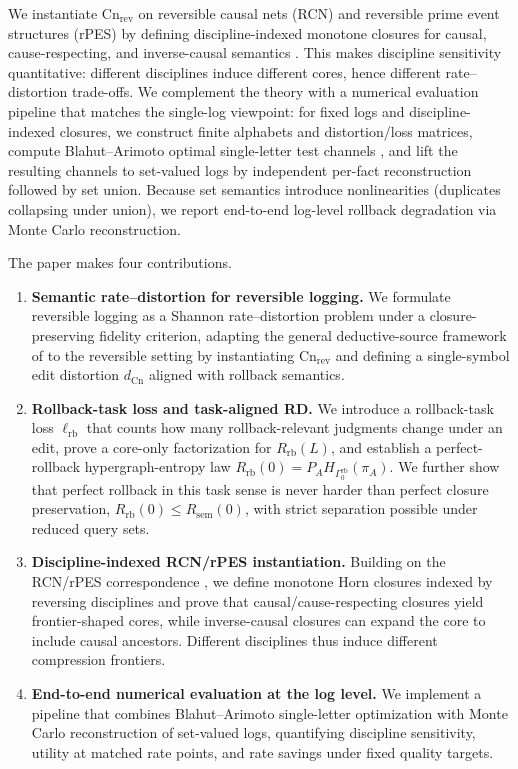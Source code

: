 \documentclass[twoside]{article}
\newcommand{\Cn}{\mathrm{Cn}}
\newcommand{\1}{\mathbf{1}}
\begin{document}
We instantiate \(\Cn_{\mathrm{rev}}\) on reversible causal nets (RCN) and
reversible prime event structures (rPES) by defining discipline-indexed monotone
closures for causal, cause-respecting, and inverse-causal semantics
\cite{melgratti2024reversible,melgratti2025relating}.
This makes discipline sensitivity quantitative: different disciplines induce
different cores, hence different rate--distortion trade-offs.
We complement the theory with a numerical evaluation pipeline that matches the
single-log viewpoint: for fixed logs and discipline-indexed closures, we construct
finite alphabets and distortion/loss matrices, compute Blahut--Arimoto optimal
single-letter test channels \cite{blahut1972computation,arimoto1972algorithm},
and lift the resulting channels to set-valued logs by independent per-fact
reconstruction followed by set union.
Because set semantics introduce nonlinearities (duplicates collapsing under
union), we report end-to-end log-level rollback degradation via Monte Carlo
reconstruction.

The paper makes four contributions.

\begin{enumerate}
    \item \textbf{Semantic rate--distortion for reversible logging.}
    We formulate reversible logging as a Shannon rate--distortion problem under a
    closure-preserving fidelity criterion, adapting the general deductive-source
    framework of \cite{xu2026rate} to the reversible setting by instantiating
    \(\Cn_{\mathrm{rev}}\) and defining a single-symbol edit distortion
    \(d_{\Cn}\) aligned with rollback semantics.

    \item \textbf{Rollback-task loss and task-aligned RD.}
    We introduce a rollback-task loss \(\ell_{\mathrm{rb}}\) that counts how many
    rollback-relevant judgments change under an edit, prove a core-only
    factorization for \(R_{\mathrm{rb}}(L)\), and establish a perfect-rollback
    hypergraph-entropy law \(R_{\mathrm{rb}}(0)=P_A H_{\Gamma_0^{\mathrm{rb}}}(\pi_A)\).
    We further show that perfect rollback in this task sense is never harder than
    perfect closure preservation, \(R_{\mathrm{rb}}(0)\le R_{\mathrm{sem}}(0)\),
    with strict separation possible under reduced query sets.

    \item \textbf{Discipline-indexed RCN/rPES instantiation.}
    Building on the RCN/rPES correspondence \cite{melgratti2024reversible}, we
    define monotone Horn closures indexed by reversing disciplines and prove that
    causal/cause-respecting closures yield frontier-shaped cores, while
    inverse-causal closures can expand the core to include causal ancestors.
    Different disciplines thus induce different compression frontiers.

    \item \textbf{End-to-end numerical evaluation at the log level.}
    We implement a pipeline that combines Blahut--Arimoto single-letter
    optimization with Monte Carlo reconstruction of set-valued logs, quantifying
    discipline sensitivity, utility at matched rate points, and rate savings
    under fixed quality targets.
\end{enumerate}
\end{document}
